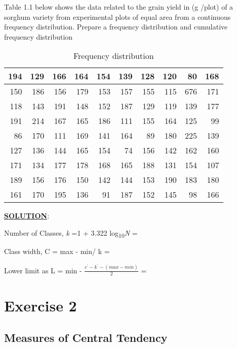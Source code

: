 \documentclass[
]{book}
\begin{document}
Table 1.1 below shows the data related to the grain yield in (g /plot) of a sorghum variety from experimental plots of equal area from a continuous frequency distribution. Prepare a frequency distribution and cumulative frequency distribution

\begin{table}

\caption{\label{tab:t11}Frequency distribution }
\centering
\begin{tabular}[t]{r|r|r|r|r|r|r|r|r|r}
\hline
194 & 129 & 166 & 164 & 154 & 139 & 128 & 120 & 80 & 168\\
\hline
150 & 186 & 156 & 179 & 153 & 157 & 155 & 115 & 676 & 171\\
\hline
118 & 143 & 191 & 148 & 152 & 187 & 129 & 119 & 139 & 177\\
\hline
191 & 214 & 167 & 165 & 186 & 111 & 155 & 164 & 125 & 99\\
\hline
86 & 170 & 111 & 169 & 141 & 164 & 89 & 180 & 225 & 139\\
\hline
127 & 136 & 144 & 165 & 154 & 74 & 156 & 142 & 162 & 160\\
\hline
171 & 134 & 177 & 178 & 168 & 165 & 188 & 131 & 154 & 107\\
\hline
189 & 156 & 176 & 150 & 142 & 144 & 153 & 190 & 183 & 180\\
\hline
161 & 170 & 195 & 136 & 91 & 187 & 152 & 145 & 98 & 166\\
\hline
\end{tabular}
\end{table}

\underline{\textbf{SOLUTION}}:

Number of Classes, \emph{k} =1 + 3.322 log\textsubscript{10}\emph{N} =

Class width, C = \textbar{} max - min\textbar/ k =

Lower limit as L = min - \(\frac{c^{'} - k^{'} - (max - min)}{2}\) =

\hypertarget{exercise-2}{%
\chapter{Exercise 2}\label{exercise-2}}

\hypertarget{measures-of-central-tendency}{%
\section{Measures of Central Tendency}\label{measures-of-central-tendency}}
\end{document}
